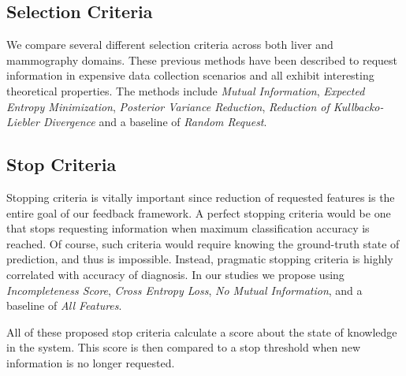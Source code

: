 \subsection{Selection Criteria}
We compare several different selection criteria across both liver and mammography domains. These previous methods have been described to request information in expensive data collection scenarios and all exhibit interesting theoretical properties. The methods include \emph{Mutual Information}, \emph{Expected Entropy Minimization}, \emph{Posterior Variance Reduction}, \emph{Reduction of Kullbacko-Liebler Divergence} and a baseline of \emph{Random Request}.

\subsection{Stop Criteria}
Stopping criteria is vitally important since reduction of requested features is the entire goal of our feedback framework. A perfect stopping criteria would be one that stops requesting information when maximum classification accuracy is reached. Of course, such criteria would require knowing the ground-truth state of prediction, and thus is impossible. Instead, pragmatic stopping criteria is highly correlated with accuracy of diagnosis. In our studies we propose using \emph{Incompleteness Score}, \emph{Cross Entropy Loss}, \emph{No Mutual Information}, and a baseline of \emph{All Features}. 

All of these proposed stop criteria calculate a score about the state of knowledge in the system. This score is then compared to a stop threshold when new information is no longer requested.